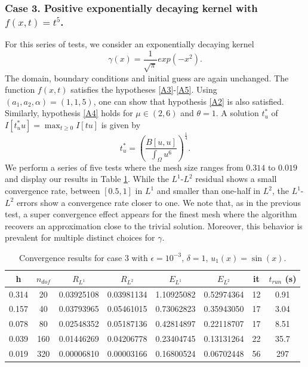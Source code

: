 \documentclass[11pt]{amsart}   	%
\theoremstyle{plain}
\numberwithin{equation}{section}
\def\ga{\gamma}
\begin{document}
\subsubsection{Case 3. Positive exponentially decaying kernel with $f(x,t)=t^5$.}\label{sec:num_case_3}
For this series of tests, we consider an exponentially decaying kernel
$$\gamma(x) = \frac{1}{\sqrt{\pi}} exp(-x^2). $$
The domain, boundary conditions and initial guess are again unchanged.
The function $f(x,t)$ satisfies the hypotheses \ref{A3}-\ref{A5}. Using  $(a_1,a_2,\alpha)=(1,1,5)$, one can show that hypothesis \ref{A2} is also satisfied. Similarly, hypothesis \ref{A4} holds for $\mu\in(2,6)$ and $\theta=1$.
A solution $t^*_u$ of $I[t^*_u u]  = \max_{t\geq 0} I[tu]$ is given by
$$t^*_u = \left( \frac{B[u,u]}{\int_\Omega u^6} \right)^{\frac{1}{4}}.$$
We perform a series of five tests where the mesh size ranges from $0.314$ to $0.019$ and display our results in Table \ref{tab:num_case_3b}. While the $L^1$-$L^2$ residual shows a small convergence rate, between $[0.5,1]$ in $L^1$ and smaller than one-half in $L^2$, the $L^1$-$L^2$ errors show a convergence rate closer to one. We note that, as in the previous test, a super convergence effect appears for the finest mesh where the algorithm recovers an approximation close to the trivial solution. Moreover, this behavior is prevalent for multiple distinct choices for $\ga$.
\begin{table}[H]
    \centering
    \caption{Convergence results for case 3 with $\epsilon=10^{-3}$, $\delta=1$, $u_1(x)=\sin(x)$.}%
    \begin{tabular}{|c|c||c|c||c|c||c|c|}
    \hline
    h & $n_{dof}$ & $R_{L^1}$ & $R_{L^2} $  & $E_{L^1}$ & $E_{L^2}$ & it & $t_{run}$ (s)
    \\ \hline
    0.314 & 20 & 0.03925108 & 0.03981134 & 1.10925082 &0.52974364  &12 & 0.91
    \\ \hline
    0.157 & 40 & 0.03793965 & 0.05461015 & 0.73062823  &0.35943050 & 17 & 3.04    
    \\ \hline
    0.078 & 80 & 0.02548352 & 0.05187136 & 0.42814897 & 0.22118707 & 17 & 8.51
    \\ \hline
    0.039 & 160 &0.01446269 & 0.04206778 & 0.23404745 & 0.13131264 & 22 & 35.7 
    \\ \hline
    0.019 & 320 & 0.00006810 &0.00003166  & 0.16800524 & 0.06702448 & 56 & 297 
    \\ \hline  
    \end{tabular}
    \label{tab:num_case_3b}
\end{table}
\end{document}

